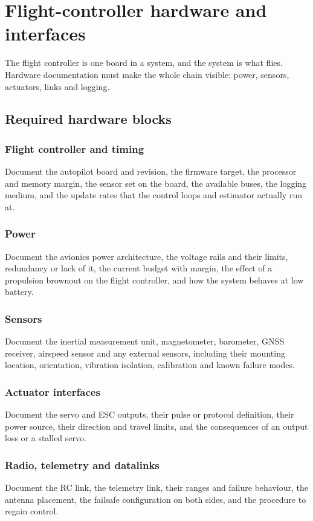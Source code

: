 \documentclass[11pt,a4paper]{article}
\begin{document}
\section{Flight-controller hardware and interfaces}

The flight controller is one board in a system, and the system is what flies.
Hardware documentation must make the whole chain visible: power, sensors,
actuators, links and logging.

\subsection{Required hardware blocks}

\subsubsection{Flight controller and timing}
Document the autopilot board and revision, the firmware target, the processor
and memory margin, the sensor set on the board, the available buses, the
logging medium, and the update rates that the control loops and estimator
actually run at.

\subsubsection{Power}
Document the avionics power architecture, the voltage rails and their limits,
redundancy or lack of it, the current budget with margin, the effect of a
propulsion brownout on the flight controller, and how the system behaves at
low battery.

\subsubsection{Sensors}
Document the inertial measurement unit, magnetometer, barometer, GNSS receiver,
airspeed sensor and any external sensors, including their mounting location,
orientation, vibration isolation, calibration and known failure modes.

\subsubsection{Actuator interfaces}
Document the servo and ESC outputs, their pulse or protocol definition, their
power source, their direction and travel limits, and the consequences of an
output loss or a stalled servo.

\subsubsection{Radio, telemetry and datalinks}
Document the RC link, the telemetry link, their ranges and failure behaviour,
the antenna placement, the failsafe configuration on both sides, and the
procedure to regain control.
\end{document}
